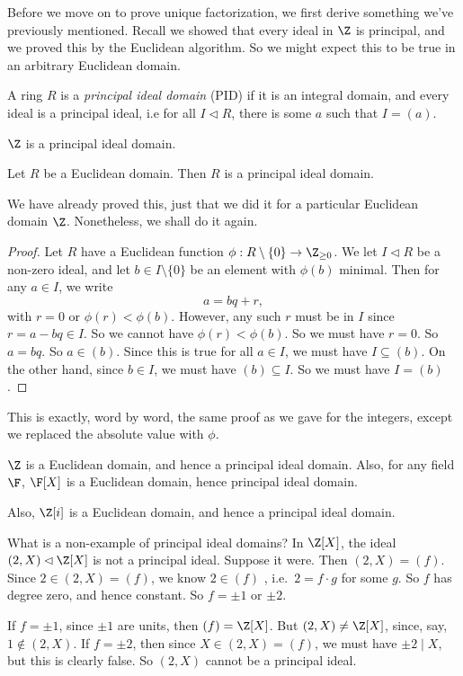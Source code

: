 \documentclass[a4paper]{article}
\begin{document}
Before we move on to prove unique factorization, we first derive something we've previously mentioned. Recall we showed that every ideal in $\Z$ is principal, and we proved this by the Euclidean algorithm. So we might expect this to be true in an arbitrary Euclidean domain.

\begin{defi}
  A ring $R$ is a \emph{principal ideal domain} (PID) if it is an integral domain, and every ideal is a principal ideal, i.e for all $I \lhd R$, there is some $a$ such that $I = (a)$.
\end{defi}

\begin{eg}
  $\Z$ is a principal ideal domain.
\end{eg}

\begin{prop}
  Let $R$ be a Euclidean domain. Then $R$ is a principal ideal domain.
\end{prop}
We have already proved this, just that we did it for a particular Euclidean domain $\Z$. Nonetheless, we shall do it again.

\begin{proof}
  Let $R$ have a Euclidean function $\phi: R \setminus \{0\} \to \Z_{\geq 0}$. We let $I \lhd R$ be a non-zero ideal, and let $b \in I\setminus \{0\}$ be an element with $\phi(b)$ minimal. Then for any $a \in I$, we write
  \[
    a = bq + r,
  \]
  with $r = 0$ or $\phi(r) < \phi(b)$. However, any such $r$ must be in $I$ since $r = a - bq \in I$. So we cannot have $\phi(r) < \phi(b)$. So we must have $r = 0$. So $a = bq$. So $a \in (b)$. Since this is true for all $a \in I$, we must have $I \subseteq (b)$. On the other hand, since $b \in I$, we must have $(b) \subseteq I$. So we must have $I = (b)$.
\end{proof}
This is exactly, word by word, the same proof as we gave for the integers, except we replaced the absolute value with $\phi$.

\begin{eg}
  $\Z$ is a Euclidean domain, and hence a principal ideal domain. Also, for any field $\F$, $\F[X]$ is a Euclidean domain, hence principal ideal domain.

  Also, $\Z[i]$ is a Euclidean domain, and hence a principal ideal domain.

  What is a non-example of principal ideal domains? In $\Z[X]$, the ideal $(2, X) \lhd \Z[X]$ is not a principal ideal. Suppose it were. Then $(2, X) = (f)$. Since $2 \in (2, X) = (f)$, we know $2 \in (f)$ , i.e.\ $2 = f\cdot g$ for some $g$. So $f$ has degree zero, and hence constant. So $f = \pm 1$ or $\pm 2$.

  If $f = \pm 1$, since $\pm 1$ are units, then $(f) = \Z[X]$. But $(2, X) \not= \Z[X]$, since, say, $1 \not\in (2, X)$. If $f = \pm 2$, then since $X \in (2, X) = (f)$, we must have $\pm 2 \mid X$, but this is clearly false. So $(2, X)$ cannot be a principal ideal.
\end{eg}
\end{document}
